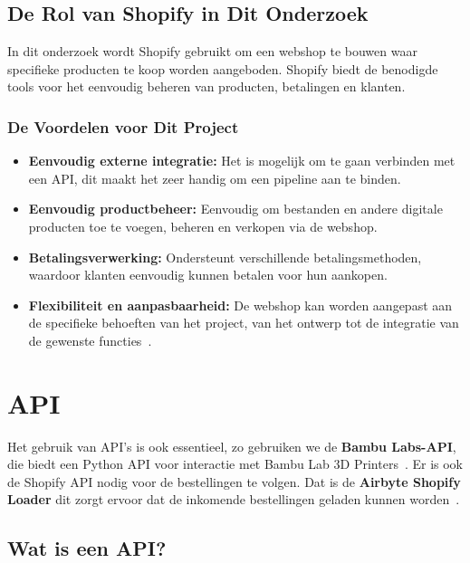 \newpage

\subsection{De Rol van Shopify in Dit Onderzoek}

In dit onderzoek wordt Shopify gebruikt om een webshop te bouwen waar specifieke producten te koop worden aangeboden. Shopify biedt de benodigde tools voor het eenvoudig beheren van producten, betalingen en klanten.

\subsubsection{De Voordelen voor Dit Project}
\begin{itemize}
     \item \textbf{Eenvoudig externe integratie:} Het is mogelijk om te gaan verbinden met een API, dit maakt het zeer handig om een pipeline aan te binden.
    \item \textbf{Eenvoudig productbeheer:} Eenvoudig om bestanden en andere digitale producten toe te voegen, beheren en verkopen via de webshop.
    \item \textbf{Betalingsverwerking:} Ondersteunt verschillende betalingsmethoden, waardoor klanten eenvoudig kunnen betalen voor hun aankopen.
    \item \textbf{Flexibiliteit en aanpasbaarheid:} De webshop kan worden aangepast aan de specifieke behoeften van het project, van het ontwerp tot de integratie van de gewenste functies~\autocite{bang2024}.
\end{itemize}

\section{API}%
\label{sec:api}

Het gebruik van API’s is ook essentieel, zo gebruiken we de \textbf{Bambu Labs-API}, die biedt een Python API voor interactie met Bambu Lab 3D Printers~\autocite{bambulabsAPI}. Er is ook de Shopify API nodig voor de bestellingen te volgen. Dat is de \textbf{Airbyte Shopify Loader} dit zorgt ervoor dat de inkomende bestellingen geladen kunnen worden~\autocite{ilamaIndexShopify}. 

\subsection{Wat is een API?}

